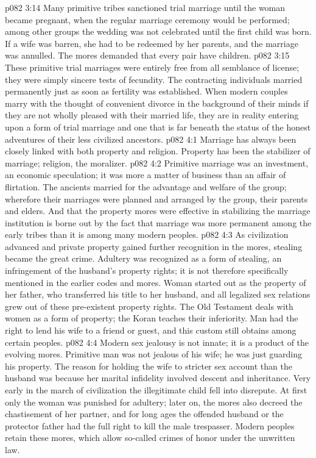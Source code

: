 \vs p082 3:14 Many primitive tribes sanctioned trial marriage until the woman became pregnant, when the regular marriage ceremony would be performed; among other groups the wedding was not celebrated until the first child was born. If a wife was barren, she had to be redeemed by her parents, and the marriage was annulled. The mores demanded that every pair have children.
\vs p082 3:15 These primitive trial marriages were entirely free from all semblance of license; they were simply sincere tests of fecundity. The contracting individuals married permanently just as soon as fertility was established. When modern couples marry with the thought of convenient divorce in the background of their minds if they are not wholly pleased with their married life, they are in reality entering upon a form of trial marriage and one that is far beneath the status of the honest adventures of their less civilized ancestors.
\vs p082 4:1 Marriage has always been closely linked with both property and religion. Property has been the stabilizer of marriage; religion, the moralizer.
\vs p082 4:2 Primitive marriage was an investment, an economic speculation; it was more a matter of business than an affair of flirtation. The ancients married for the advantage and welfare of the group; wherefore their marriages were planned and arranged by the group, their parents and elders. And that the property mores were effective in stabilizing the marriage institution is borne out by the fact that marriage was more permanent among the early tribes than it is among many modern peoples.
\vs p082 4:3 As civilization advanced and private property gained further recognition in the mores, stealing became the great crime. Adultery was recognized as a form of stealing, an infringement of the husband’s property rights; it is not therefore specifically mentioned in the earlier codes and mores. Woman started out as the property of her father, who transferred his title to her husband, and all legalized sex relations grew out of these pre\hyp{}existent property rights. The Old Testament deals with women as a form of property; the Koran teaches their inferiority. Man had the right to lend his wife to a friend or guest, and this custom still obtains among certain peoples.
\vs p082 4:4 Modern sex jealousy is not innate; it is a product of the evolving mores. Primitive man was not jealous of his wife; he was just guarding his property. The reason for holding the wife to stricter sex account than the husband was because her marital infidelity involved descent and inheritance. Very early in the march of civilization the illegitimate child fell into disrepute. At first only the woman was punished for adultery; later on, the mores also decreed the chastisement of her partner, and for long ages the offended husband or the protector father had the full right to kill the male trespasser. Modern peoples retain these mores, which allow so\hyp{}called crimes of honor under the unwritten law.
